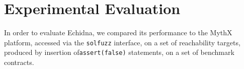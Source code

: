 \section{Experimental Evaluation}

In order to evaluate Echidna, we compared its performance to the MythX platform, accessed via the {\tt solfuzz} interface, on a set of reachability targets, produced by insertion of{\tt assert(false)} statements, on a set of benchmark contracts.

